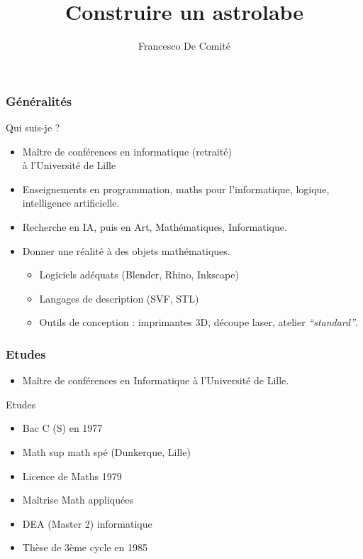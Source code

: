 \documentclass{beamer}
\title[Construire un astrolabe]{Construire un astrolabe}
\author{Francesco De Comité}\institute{Ex-Université de Lille \\ Faculté des Sciences et Technologies}
\begin{document}
 \begin{frame}
\titlepage
{}
   \end{frame}

  
 \begin{frame}\frametitle{Généralités}

\begin{block}{Qui suis-je ? }
\begin{itemize}
\item Maître de conférences en informatique (retraité) \\ à l'Université de Lille
\item Enseignements en programmation, maths pour l'informatique, logique, intelligence artificielle. 
\item Recherche en IA, puis en Art, Mathématiques, Informatique. 
\item \begin{block}{Donner une réalité à des objets mathématiques. }
	\begin{itemize}
	\item Logiciels adéquats (Blender, Rhino, Inkscape)
	\item Langages de description (SVF, STL)
	\item Outils de conception : imprimantes 3D, découpe laser, atelier {\it ``standard''}.
	\end{itemize}
	\end{block}
\end{itemize}
\end{block}

   \end{frame}


  
 \begin{frame}\frametitle{Etudes}
\begin{itemize}
\item Maître de conférences en Informatique à l'Université de Lille. 
\end{itemize}
\begin{block}{Etudes }
	\begin{itemize}
	\item  Bac C (S) en 1977
	\item Math sup math spé (Dunkerque, Lille)
	\item Licence de Maths 1979
	\item Maîtrise Math appliquées
	\item DEA (Master 2) informatique
	\item Thèse de 3ème cycle en 1985
	\end{itemize}
\end{block}

\end{frame}
\end{document}
